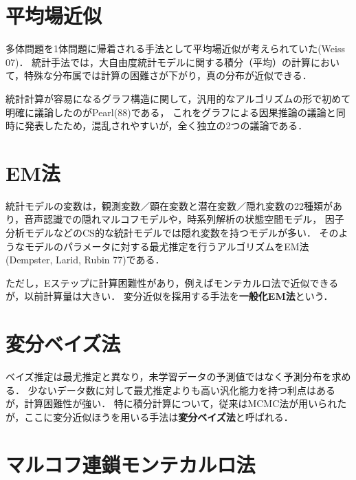 \documentclass[uplatex,dvipdfmx]{jsreport}
\begin{document}
\section{平均場近似}

\begin{history}
    多体問題を1体問題に帰着される手法として平均場近似が考えられていた(Weiss 07)．
    統計手法では，大自由度統計モデルに関する積分（平均）の計算において，特殊な分布属では計算の困難さが下がり，真の分布が近似できる．

    統計計算が容易になるグラフ構造に関して，汎用的なアルゴリズムの形で初めて明確に議論したのがPearl(88)である，
    これをグラフによる因果推論の議論と同時に発表したため，混乱されやすいが，全く独立の2つの議論である．

\end{history}

\section{EM法}

\begin{discussion}
    統計モデルの変数は，観測変数／顕在変数と潜在変数／隠れ変数の22種類があり，音声認識での隠れマルコフモデルや，時系列解析の状態空間モデル，
    因子分析モデルなどのCS的な統計モデルでは隠れ変数を持つモデルが多い．
    そのようなモデルのパラメータに対する最尤推定を行うアルゴリズムをEM法(Dempster, Larid, Rubin 77)である．

    ただし，Eステップに計算困難性があり，例えばモンテカルロ法で近似できるが，以前計算量は大きい．
    変分近似を採用する手法を\textbf{一般化EM法}という．
\end{discussion}

\section{変分ベイズ法}

\begin{history}
    ベイズ推定は最尤推定と異なり，未学習データの予測値ではなく予測分布を求める．
    少ないデータ数に対して最尤推定よりも高い汎化能力を持つ利点はあるが，計算困難性が強い．
    特に積分計算について，従来はMCMC法が用いられたが，ここに変分近似ほうを用いる手法は\textbf{変分ベイズ法}と呼ばれる．
\end{history}

\section{マルコフ連鎖モンテカルロ法}
\end{document}

